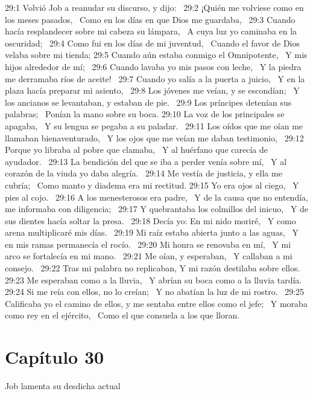 29:1 Volvió Job a reanudar su discurso, y dijo:  
29:2 ¡Quién me volviese como en los meses pasados,  
Como en los días en que Dios me guardaba,  
29:3 Cuando hacía resplandecer sobre mi cabeza su lámpara,  
A cuya luz yo caminaba en la oscuridad;  
29:4 Como fui en los días de mi juventud,  
Cuando el favor de Dios velaba sobre mi tienda; 
29:5 Cuando aún estaba conmigo el Omnipotente,  
Y mis hijos alrededor de mí;  
29:6 Cuando lavaba yo mis pasos con leche,  
Y la piedra me derramaba ríos de aceite!  
29:7 Cuando yo salía a la puerta a juicio,  
Y en la plaza hacía preparar mi asiento,  
29:8 Los jóvenes me veían, y se escondían;  
Y los ancianos se levantaban, y estaban de pie.  
29:9 Los príncipes detenían sus palabras;  
Ponían la mano sobre su boca. 
29:10 La voz de los principales se apagaba,  
Y su lengua se pegaba a su paladar.  
29:11 Los oídos que me oían me llamaban bienaventurado,  
Y los ojos que me veían me daban testimonio,  
29:12 Porque yo libraba al pobre que clamaba,  
Y al huérfano que carecía de ayudador.  
29:13 La bendición del que se iba a perder venía sobre mí,  
Y al corazón de la viuda yo daba alegría.  
29:14 Me vestía de justicia, y ella me cubría;  
Como manto y diadema era mi rectitud. 
29:15 Yo era ojos al ciego,  
Y pies al cojo.  
29:16 A los menesterosos era padre,  
Y de la causa que no entendía, me informaba con diligencia;  
29:17 Y quebrantaba los colmillos del inicuo,  
Y de sus dientes hacía soltar la presa.  
29:18 Decía yo: En mi nido moriré,  
Y como arena multiplicaré mis días.  
29:19 Mi raíz estaba abierta junto a las aguas,  
Y en mis ramas permanecía el rocío.  
29:20 Mi honra se renovaba en mí,  
Y mi arco se fortalecía en mi mano.  
29:21 Me oían, y esperaban,  
Y callaban a mi consejo.  
29:22 Tras mi palabra no replicaban, 
Y mi razón destilaba sobre ellos.  
29:23 Me esperaban como a la lluvia,  
Y abrían su boca como a la lluvia tardía.  
29:24 Si me reía con ellos, no lo creían;  
Y no abatían la luz de mi rostro.  
29:25 Calificaba yo el camino de ellos, y me sentaba entre ellos como el jefe;  
Y moraba como rey en el ejército,  
Como el que consuela a los que lloran.  
\section*{Capítulo 30}
Job lamenta su desdicha actual  

